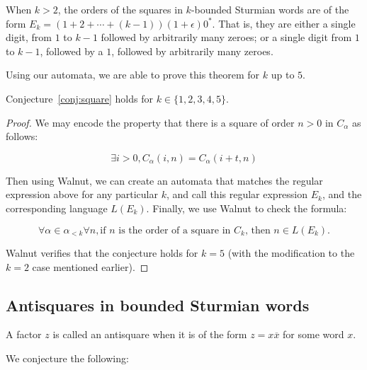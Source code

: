\begin{conjecture}\label{conj:square}
    When $k > 2$, the orders of the squares in $k$-bounded Sturmian words are of the form $E_k = (1+2+\cdots+(k-1))(1+\epsilon)0^*$.
    That is, they are either a single digit, from $1$ to $k-1$ followed by arbitrarily many zeroes; or a single digit from $1$ to $k-1$, followed by a $1$, followed by arbitrarily many zeroes.
\end{conjecture}

Using our automata, we are able to prove this theorem for $k$ up to $5$.

\begin{theorem}\label{thm:square-conj-prf}
Conjecture~\ref{conj:square} holds for $k \in \{1,2,3,4,5\}$.
\end{theorem}
\begin{proof}
We may encode the property that there is a square of order $n > 0$ in $C_{\alpha}$ as follows:

\begin{equation*}\label{def:square}
\exists i > 0, C_{\alpha}(i,n) = C_{\alpha}(i+t,n)
\end{equation*}

Then using Walnut, we can create an automata that matches the regular expression above for any particular $k$, and call this regular expression $E_k$, and the corresponding language $L(E_k)$.
Finally, we use Walnut to check the formula:

\begin{equation*}\label{def:square-conj}
\forall \alpha \in \alpha_{<k} \forall n, \text{if $n$ is the order of a square in $C_k$, then $n \in L(E_k)$}.
\end{equation*}

Walnut verifies that the conjecture holds for $k=5$ (with the modification to the $k=2$ case mentioned earlier).
\end{proof}

\subsection{Antisquares in bounded Sturmian words}

A factor $z$ is called an antisquare when it is of the form $z = x\overline{x}$ for some word $x$.

We conjecture the following:

